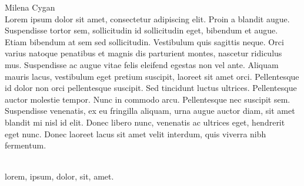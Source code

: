 \begin{newrevplenv}{Milena Cygan}
{}\\
{Lorem ipsum dolor sit amet, consectetur adipiscing elit. Proin a blandit augue. Suspendisse tortor sem, sollicitudin id sollicitudin eget, bibendum et augue. Etiam bibendum at sem sed sollicitudin. Vestibulum quis sagittis neque. Orci varius natoque penatibus et magnis dis parturient montes, nascetur ridiculus mus. Suspendisse ac augue vitae felis eleifend egestas non vel ante. Aliquam mauris lacus, vestibulum eget pretium suscipit, laoreet sit amet orci. Pellentesque id dolor non orci pellentesque suscipit. Sed tincidunt luctus ultrices. Pellentesque auctor molestie tempor. Nunc in commodo arcu. Pellentesque nec suscipit sem. Suspendisse venenatis, ex eu fringilla aliquam, urna augue auctor diam, sit amet blandit mi nisl id elit. Donec libero nunc, venenatis ac ultrices eget, hendrerit eget nunc. Donec laoreet lacus sit amet velit interdum, quis viverra nibh fermentum.}\par%
\vspace{2mm}%
{}\\%
{lorem, ipsum, dolor, sit, amet.}%


\end{newrevplenv}
